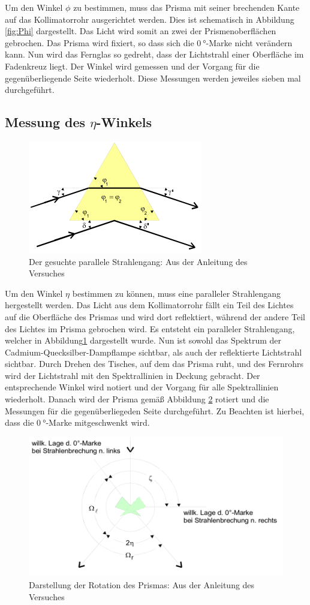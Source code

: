 Um den Winkel $\phi$ zu bestimmen, muss das Prisma mit seiner brechenden Kante auf das Kollimatorrohr ausgerichtet werden.
Dies ist schematisch in Abbildung \ref{fig:Phi} dargestellt.
Das Licht wird somit an zwei der Prismenoberflächen gebrochen.
Das Prisma wird fixiert, so dass sich die $\SI{0}{\degree}$-Marke nicht verändern kann.
Nun wird das Fernglas so gedreht, dass der Lichtstrahl einer Oberfläche im Fadenkreuz liegt.
Der Winkel wird gemessen und der Vorgang für die gegenüberliegende Seite wiederholt.
Diese Messungen werden jeweiles sieben mal durchgeführt.

\subsection{Messung des \texorpdfstring{$\eta$}{eta}-Winkels}

\begin{figure}
  \centering
  \includegraphics[scale=0.6]{images/Eta.png}
  \caption{Der gesuchte parallele Strahlengang: Aus der Anleitung des Versuches \cite[26]{1}}
  \label{fig:Eta}
\end{figure}

Um den Winkel $\eta$ bestimmen zu können, muss eine paralleler Strahlengang hergestellt werden.
Das Licht aus dem Kollimatorrohr fällt ein Teil des Lichtes auf die Oberfläche des Prismas und wird dort reflektiert, während der andere Teil des Lichtes im Prisma gebrochen wird.
Es entsteht ein paralleler Strahlengang, welcher in Abbildung\ref{fig:Eta} dargestellt wurde.
Nun ist sowohl das Spektrum der Cadmium-Quecksilber-Dampflampe sichtbar, als auch der reflektierte Lichtstrahl sichtbar.
Durch Drehen des Tisches, auf dem das Prisma ruht, und des Fernrohrs wird der Lichtstrahl mit den Spektrallinien in Deckung gebracht.
Der entsprechende Winkel wird notiert und der Vorgang für alle Spektrallinien wiederholt.
Danach wird der Prisma gemäß Abbildung \ref{fig:Drehung} rotiert und die Messungen für die gegenüberliegeden Seite durchgeführt.
Zu Beachten ist hierbei, dass die $\SI{0}{\degree}$-Marke mitgeschwenkt wird.

\begin{figure}
  \centering
  \includegraphics[scale=0.6]{images/Drehung.png}
  \caption{Darstellung der Rotation des Prismas: Aus der Anleitung des Versuches \cite[26]{1}}
  \label{fig:Drehung}
\end{figure}
